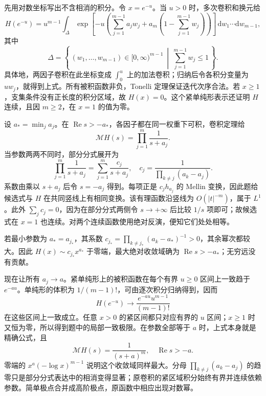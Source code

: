 \begin{solution}
先用对数坐标写出不含相消的积分。令 \(x=e^{-u}\)。当 \(u>0\) 时，多次卷积和换元给
\[
 H(e^{-u})=u^{m-1}\int_{\Delta}
 \exp\left[-u\left(\sum_{j=1}^{m-1}a_jw_j
              +a_m\left(1-\sum_{j=1}^{m-1}w_j\right)\right)\right]
 \,\mathrm{d}w_1\cdots\mathrm{d}w_{m-1},
\]
其中
\[
 \Delta=\left\{\,(w_1,\ldots,w_{m-1})\in[0,\infty)^{m-1}
          \ \middle|\ \sum_{j=1}^{m-1}w_j\le1\,\right\}.
\]
具体地，两因子卷积在此坐标变成 \(\int_0^u\) 上的加法卷积；归纳后令各积分变量为 \(uw_j\)，就得到上式。所有被积函数非负，Tonelli 定理保证迭代次序合法。若 \(x\ge1\)，支集条件没有正长度的积分区域，故 \(H(x)=0\)。这个紧单纯形表示还证明 \(H\) 连续，且因 \(m\ge2\)，在 \(x=1\) 的值为零。

设 \(a_* =\min_j a_j\)。在 \(\operatorname{Re}s>-a_*\)，各因子都在同一权重下可积，卷积定理给
\[
 \mathcal MH(s)=\prod_{j=1}^m\frac1{s+a_j}.
\]
当参数两两不同时，部分分式展开为
\[
 \prod_{j=1}^m\frac1{s+a_j}
 =\sum_{j=1}^m\frac{c_j}{s+a_j},\quad
 c_j=\frac1{\prod_{k\ne j}(a_k-a_j)}.
\]
系数由乘以 \(s+a_j\) 后令 \(s=-a_j\) 得到。每项正是 \(c_jh_{a_j}\) 的 Mellin 变换，因此题给候选式与 \(H\) 在共同竖线上有相同变换。该有理函数沿竖线为 \(O(|t|^{-m})\)，属于 \(L^1\)。此外 \(\sum_jc_j=0\)，因为在部分分式两侧令 \(s\to+\infty\) 后比较 \(1/s\) 项即可；故候选式在 \(x=1\) 也连续。对两个连续函数使用绝对反演，便知它们处处相等。

若最小参数为 \(a_*=a_{j_*}\)，其系数
\(c_{j_*}=\prod_{k\ne j_*}(a_k-a_*)^{-1}>0\)，其余幂次都较大。因此
\(H(x)\sim c_{j_*}x^{a_*}\) 于零端，最大绝对收敛域确为 \(\operatorname{Re}s>-a_*\)；无穷远没有贡献。

现在让所有 \(a_j\to a\)。紧单纯形上的被积函数在每个有界 \(u\ge0\) 区间上一致趋于 \(e^{-au}\)。单纯形的体积为 \(1/(m-1)!\)，可由逐次积分归纳得到，因而
\[
 H(e^{-u})\longrightarrow
 \frac{e^{-au}u^{m-1}}{(m-1)!}
\]
在这些区间上一致成立。任意 \(x>0\) 的紧区间都只对应有界的 \(u\) 区间；\(x\ge1\) 时又恒为零，所以得到题中的局部一致极限。在参数全部等于 \(a\) 时，上式本身就是精确公式，且
\[
 \mathcal MH(s)=\frac1{(s+a)^m},\quad
 \operatorname{Re}s>-a.
\]
零端的 \(x^a(-\log x)^{m-1}\) 说明这个收敛域同样最大。分母 \(\prod_{k\ne j}(a_k-a_j)\) 的趋零只是部分分式表达中的相消变得显著；原卷积的紧区域积分始终有界并连续依赖参数。简单极点合并成高阶极点，原函数中相应出现对数幂。
\end{solution}

